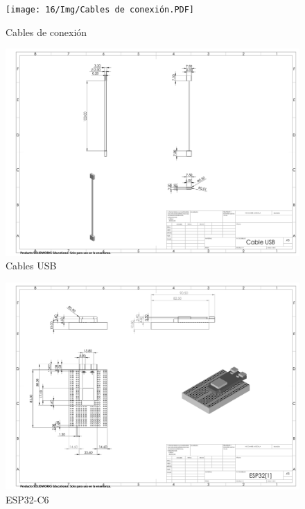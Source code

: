     \begin{figure}[H]
        \centering
        \texttt{[image: 16/Img/Cables de conexión.PDF]}
        \caption{Cables de conexión}
        \label{fig:Cables de conexión}
    \end{figure}
    \begin{figure}[H]
        \centering
        \includegraphics[trim = {10mm 10mm 10mm 10mm},clip,scale=0.150]{16/Img/Cable USB.PDF}
        \caption{Cables USB}
        \label{fig:Cable USB}
    \end{figure}
    \begin{figure}[H]
        \centering
        \includegraphics[trim = {10mm 10mm 10mm 10mm},clip,scale=0.150]{16/Img/ESP32.PDF}
        \caption{ESP32-C6}
        \label{fig:ESP32-C6}
    \end{figure}
